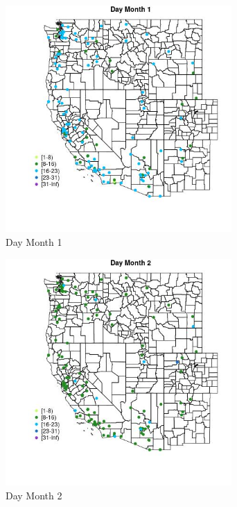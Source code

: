 \begin{figure} 
\centering  
\includegraphics[width=0.77\textwidth]{Code_Outputs/Report_ML_input_PM25_Step4_part_e_de_duplicated_aves_MapObsMo1Day.jpg} 
\caption{\label{fig:Report_ML_input_PM25_Step4_part_e_de_duplicated_avesMapObsMo1Day}Day Month 1} 
\end{figure} 
 

\begin{figure} 
\centering  
\includegraphics[width=0.77\textwidth]{Code_Outputs/Report_ML_input_PM25_Step4_part_e_de_duplicated_aves_MapObsMo2Day.jpg} 
\caption{\label{fig:Report_ML_input_PM25_Step4_part_e_de_duplicated_avesMapObsMo2Day}Day Month 2} 
\end{figure} 
 


